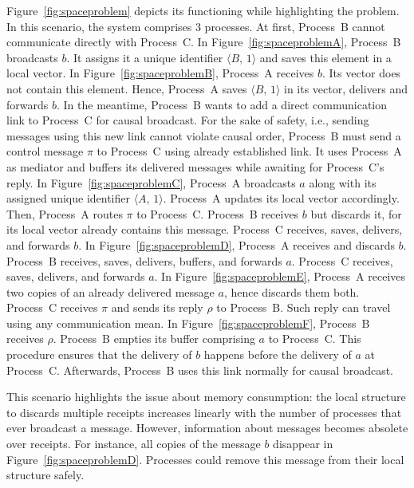Figure~\ref{fig:spaceproblem} depicts its functioning while highlighting the
problem. In this scenario, the system comprises 3 processes. At first, Process~B
cannot communicate directly with Process~C. In Figure~\ref{fig:spaceproblemA},
Process~B broadcasts $b$. It assigns it a unique identifier
$\langle B,\, 1 \rangle$ and saves this element in a local vector. In
Figure~\ref{fig:spaceproblemB}, Process~A receives $b$. Its vector does not
contain this element. Hence, Process~A saves $\langle B,\,1\rangle$ in its
vector, delivers and forwards $b$. In the meantime, Process~B wants to add a
direct communication link to Process~C for causal broadcast. For the sake of
safety, i.e., sending messages using this new link cannot violate causal order,
Process~B must send a control message $\pi$ to Process~C using already
established link. It uses Process~A as mediator and buffers its delivered
messages while awaiting for Process~C's reply. In
Figure~\ref{fig:spaceproblemC}, Process~A broadcasts $a$ along with its assigned
unique identifier $\langle A,\, 1 \rangle$. Process~A updates its local vector
accordingly. Then, Process~A routes $\pi$ to Process~C. Process~B receives $b$
but discards it, for its local vector already contains this message.  Process~C
receives, saves, delivers, and forwards $b$. In Figure~\ref{fig:spaceproblemD},
Process~A receives and discards $b$. Process~B receives, saves, delivers,
buffers, and forwards $a$. Process~C receives, saves, delivers, and forwards
$a$. In Figure~\ref{fig:spaceproblemE}, Process~A receives two copies of an
already delivered message $a$, hence discards them both. Process~C receives
$\pi$ and sends its reply $\rho$ to Process~B. Such reply can travel using any
communication mean. In Figure~\ref{fig:spaceproblemF}, Process~B receives
$\rho$. Process~B empties its buffer comprising $a$ to Process~C. This procedure
ensures that the delivery of $b$ happens before the delivery of $a$ at
Process~C. Afterwards, Process~B uses this link normally for causal broadcast.

This scenario highlights the issue about memory consumption: the local structure
to discards multiple receipts increases linearly with the number of processes
that ever broadcast a message. However, information about messages becomes
absolete over receipts. For instance, all copies of the message $b$ disappear in
Figure~\ref{fig:spaceproblemD}. Processes could remove this message from their
local structure safely.

